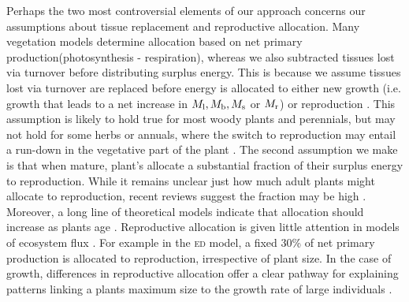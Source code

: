 \documentclass[a4paper,11pt]{article}
\begin{document}
Perhaps the two most controversial elements of our approach concerns our assumptions about tissue replacement and reproductive allocation. Many vegetation models determine allocation based on net primary production(photosynthesis - respiration), whereas we also subtracted tissues lost via turnover before distributing surplus energy. This is because  we assume tissues lost via turnover are replaced before energy is allocated to either new growth (i.e. growth that leads to a net increase in $M_{\rm l}, M_{\rm b}, M_{\rm s}$ or $M_{\rm r}$) or reproduction \citep{Thornley-2000}. This assumption is likely to hold true for most woody plants and perennials, but may not hold for some herbs or annuals, where the switch to reproduction may entail a run-down in the vegetative part of the plant
. The second assumption we make is that when mature, plant's allocate a substantial fraction of their surplus energy to reproduction. While it remains unclear just how much adult plants might allocate to reproduction, recent reviews suggest the fraction may be high \citep{Thomas-2011, Wenk-2015}. Moreover, a long line of theoretical models indicate that allocation should increase as plants age \citep[reviewed by ][]{Wenk-2015}. Reproductive allocation is given little attention in models of ecosystem flux \citep[e.g.][]{Sitch-2008, DeKauwe-2014}. For example in the \textsc{ed} model, a fixed 30\% of net primary production is allocated to reproduction, irrespective of plant size. In the case of growth, differences in reproductive allocation offer a clear pathway for explaining patterns linking a plants maximum size to the growth rate of large individuals \citep[e.g.][]{Wright-2010}.
\end{document}

